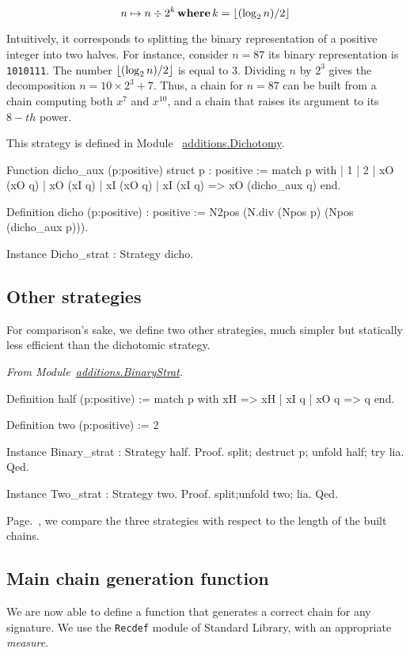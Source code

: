 $$n \mapsto  n \div {2^k} \,\textbf{where}\, k=\lfloor(\log_2{n})/2\rfloor$$

Intuitively, it corresponds to splitting the binary representation of a positive
integer into two halves. For instance, consider $n=87$ its binary representation
is \texttt{1010111}. The number $\lfloor(\log_2{n})/2\rfloor$ is equal to $3$.
Dividing $n$ by $2^3$ gives the decomposition $n=10 \times 2^3 + 7$.
Thus, a chain for $n=87$ can be built from a chain computing both $x^7$ and $x^{10}$,
and a chain that raises its argument to its $8-th$ power.


This strategy is defined in Module ~\href{../theories/html/additions.Dichotomy.html}{additions.Dichotomy}.


\begin{Coqsrc}
Function dicho_aux (p:positive) {struct p} : positive :=
 match p with
   | 1%
   | 2%
   | xO (xO q) | xO (xI q) | xI (xO q) | xI (xI q) =>
                                         xO (dicho_aux q)
 end.

Definition dicho  (p:positive) : positive :=
  N2pos (N.div (Npos p) (Npos (dicho_aux p))). 

Instance Dicho_strat : Strategy dicho.
\end{Coqsrc}


\subsection{Other strategies}
For comparison's sake, we define two other strategies, much simpler but statically less efficient than the dichotomic strategy.

\emph{From Module~\href{../theories/html/additions.BinaryStrat.html}{additions.BinaryStrat}.}

\begin{Coqsrc}
Definition half (p:positive) :=
  match p with xH => xH
          |    xI q | xO q =>  q
  end.

Definition two (p:positive) := 2%

Instance Binary_strat : Strategy half.
Proof.
  split; destruct p; unfold half; try lia.
Qed.

Instance Two_strat : Strategy two.
Proof.
  split;unfold two; lia.
Qed.
\end{Coqsrc}

Page.~\pageref{sect:test-strat}, we compare the three strategies with respect to the length of the built chains.

\subsection{Main chain generation function}
We are now able to define a function that generates a correct chain 
for any signature. We use the \texttt{Recdef} module of Standard Library,
with an appropriate \emph{measure}.

